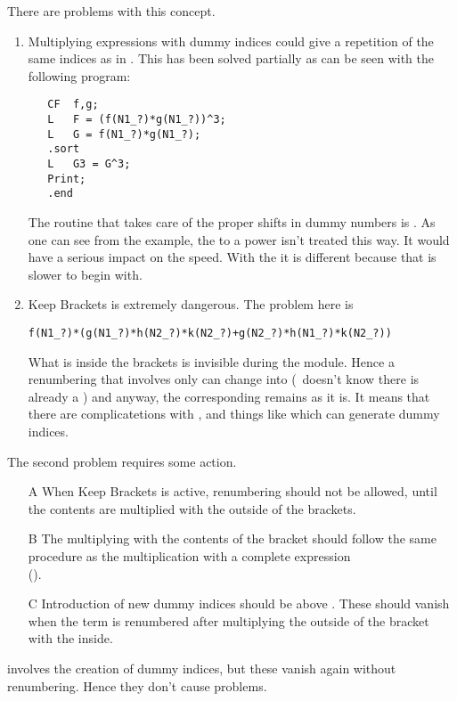 There are problems with this concept.
\begin{enumerate}
\item Multiplying expressions with dummy indices could give a repetition of 
	the same indices as in . This has been solved 
   partially as can be seen with the following program:
\begin{verbatim}
   CF  f,g;
   L   F = (f(N1_?)*g(N1_?))^3;
   L   G = f(N1_?)*g(N1_?);
   .sort
   L   G3 = G^3;
   Print;
   .end
\end{verbatim}
   The routine that takes care of the proper shifts in dummy numbers is
   . As one can see from the example, the  to a
   power isn't treated this way. It would have a serious impact on the
   speed. With the  it is different because that is slower to begin
   with.
\item Keep Brackets is extremely dangerous. The problem here is
\begin{verbatim}
f(N1_?)*(g(N1_?)*h(N2_?)*k(N2_?)+g(N2_?)*h(N1_?)*k(N2_?))
\end{verbatim}
   What is inside the brackets is invisible during the module. Hence a 
   renumbering that involves  only can change  into 
   (\FORM\ doesn't know there is already a ) and anyway, the 
   corresponding  remains as it is.
   It means that there are complicatetions with ,  and things like
    which can generate dummy indices.
\end{enumerate}

The second problem requires some action.
\begin{enumerate}
\item[A] When Keep Brackets is active, renumbering should not be allowed, until
   the contents are multiplied with the outside of the brackets.
\item[B] The multiplying with the contents of the bracket should follow the same
   procedure as the multiplication with a complete expression \\
   ().
\item[C] Introduction of new dummy indices should be above .
   These should vanish when the term is renumbered after multiplying the
   outside of the bracket with the inside.
\end{enumerate}

 involves the creation of dummy indices, but these vanish again 
without renumbering. Hence they don't cause problems.

